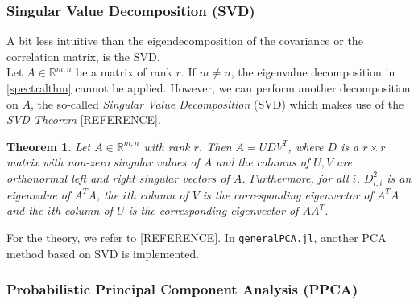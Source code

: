 \documentclass[journal, a4paper]{IEEEtran}
\newtheorem{theorem}{Theorem}[section]
\begin{document}
\hfill 
\subsubsection{Singular Value Decomposition (SVD)}\label{svd}


A bit less intuitive than the eigendecomposition of the covariance or the correlation matrix, is the SVD.\\
Let \( A \in \mathbb{R}^{m,n} \) be a matrix of rank \( r \). If \( m \neq n\), the eigenvalue decomposition in \ref{spectralthm} cannot be applied. However, we can perform another decomposition on \( A \), the so-called \textit{Singular Value Decomposition} (SVD) which makes use of the \textit{SVD Theorem} [REFERENCE].
\begin{theorem}\label{svdthm}
	Let \( A \in \mathbb{R}^{m,n} \) with rank \( r \). Then \( A = UDV^T\), where \( D \) is a \( r \times r \) matrix with non-zero singular values of \( A \) and the columns of \( U, V \) are orthonormal left and right singular vectors of \( A \). Furthermore, for all \( i \), \( D_{i,i}^{2} \) is an eigenvalue of \( A^T A\), the \( i \)th column of \( V \) is the corresponding eigenvector of \( A^T A\) and the \( i \)th column of \( U \) is the corresponding eigenvector of \( A A^T\).
\end{theorem}

% 
For the theory, we refer to [REFERENCE]. 
In \texttt{generalPCA.jl}, another PCA method based on SVD is implemented.



\hfill
\subsubsection{Probabilistic Principal Component Analysis (PPCA)}
\end{document}

